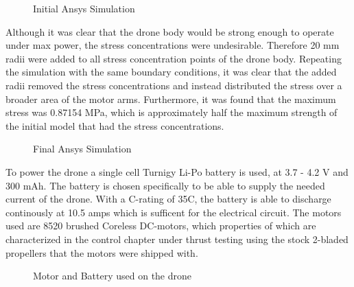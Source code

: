 \begin{figure}[H]%
    \centering
    \caption{Initial Ansys Simulation}%
    \label{fig:example}%
\end{figure}

Although it was clear that the drone body would be strong enough to operate under max power, the stress concentrations were undesirable. Therefore 20 mm radii were added to all stress concentration points of the drone body. Repeating the simulation with the same boundary conditions, it was clear that the added radii removed the stress concentrations and instead distributed the stress over a broader area of the motor arms. Furthermore, it was found that the maximum stress was 0.87154 MPa, which is approximately half the maximum strength of the initial model that had the stress concentrations.

\begin{figure}[H]%
    \centering
    \caption{Final Ansys Simulation}%
    \label{fig:example}%
\end{figure}

To power the drone a single cell Turnigy Li-Po battery is used, at 3.7 - 4.2 V and 300 mAh. The battery is chosen specifically to be able to supply the needed current of the drone. With a C-rating of 35C, the battery is able to discharge continously at 10.5 amps which is sufficent for the electrical circuit. The motors used are 8520 brushed Coreless DC-motors, which properties of which are characterized in the control chapter under thrust testing using the stock 2-bladed propellers that the motors were shipped with. 

\begin{figure}[H]%
    \centering
    \qquad
    \caption{Motor and Battery used on the drone}%
    \label{fig:example}%
\end{figure}

